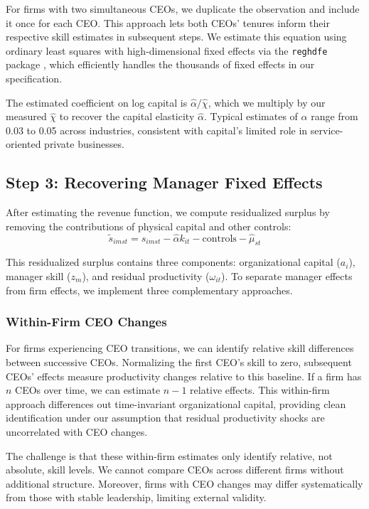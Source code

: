 \documentclass[11pt,a4paper]{article}
\begin{document}
For firms with two simultaneous CEOs, we duplicate the observation and include it once for each CEO. This approach lets both CEOs' tenures inform their respective skill estimates in subsequent steps. We estimate this equation using ordinary least squares with high-dimensional fixed effects via the \texttt{reghdfe} package \citep{reghdfe}, which efficiently handles the thousands of fixed effects in our specification.

The estimated coefficient on log capital is $\hat{\alpha}/\hat{\chi}$, which we multiply by our measured $\hat{\chi}$ to recover the capital elasticity $\hat{\alpha}$. Typical estimates of $\alpha$ range from 0.03 to 0.05 across industries, consistent with capital's limited role in service-oriented private businesses.

\subsection{Step 3: Recovering Manager Fixed Effects}

After estimating the revenue function, we compute residualized surplus by removing the contributions of physical capital and other controls:
\begin{equation}
\tilde{s}_{imst} = s_{imst} - \hat{\alpha} k_{it} - \text{controls} - \hat{\mu}_{st}
\end{equation}

This residualized surplus contains three components: organizational capital ($a_i$), manager skill ($z_m$), and residual productivity ($\omega_{it}$). To separate manager effects from firm effects, we implement three complementary approaches.

\subsubsection{Within-Firm CEO Changes}

For firms experiencing CEO transitions, we can identify relative skill differences between successive CEOs. Normalizing the first CEO's skill to zero, subsequent CEOs' effects measure productivity changes relative to this baseline. If a firm has $n$ CEOs over time, we can estimate $n-1$ relative effects. This within-firm approach differences out time-invariant organizational capital, providing clean identification under our assumption that residual productivity shocks are uncorrelated with CEO changes.

The challenge is that these within-firm estimates only identify relative, not absolute, skill levels. We cannot compare CEOs across different firms without additional structure. Moreover, firms with CEO changes may differ systematically from those with stable leadership, limiting external validity.
\end{document}
